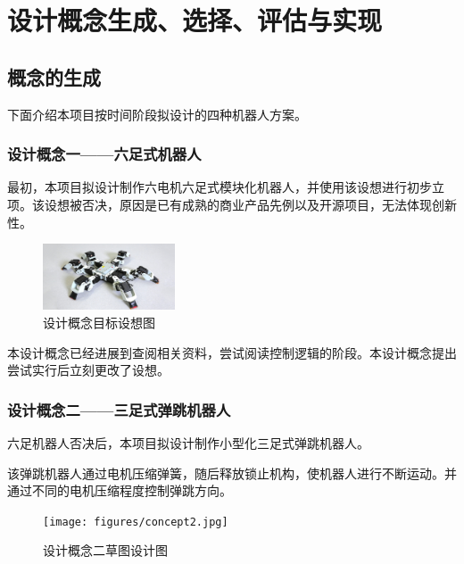 \documentclass[a4paper]{ctexart}
\numberwithin{equation}{section}
\numberwithin{table}{section}
\numberwithin{figure}{section}
\begin{document}
\section{设计概念生成、选择、评估与实现}


\subsection{概念的生成}

下面介绍本项目按时间阶段拟设计的四种机器人方案。

\subsubsection{设计概念一——六足式机器人}

最初，本项目拟设计制作六电机六足式模块化机器人，并使用该设想进行初步立项。该设想被否决，原因是已有成熟的商业产品先例以及开源项目，无法体现创新性。

\begin{figure}[H]
  \begin{center}
    \includegraphics[width=0.35\textwidth]{figures/sixfeet.jpeg}
  \end{center}
  \label{fig_concept_1}
  \caption{设计概念目标设想图}
\end{figure}

本设计概念已经进展到查阅相关资料，尝试阅读控制逻辑的阶段。本设计概念提出尝试实行后立刻更改了设想。


\subsubsection{设计概念二——三足式弹跳机器人}

六足机器人否决后，本项目拟设计制作小型化三足式弹跳机器人。

该弹跳机器人通过电机压缩弹簧，随后释放锁止机构，使机器人进行不断运动。并通过不同的电机压缩程度控制弹跳方向。

\begin{figure}[H]
  \begin{center}
    \texttt{[image: figures/concept2.jpg]}
  \end{center}
  \label{fig_concept_2}
  \caption{设计概念二草图设计图}
\end{figure}
\end{document}

